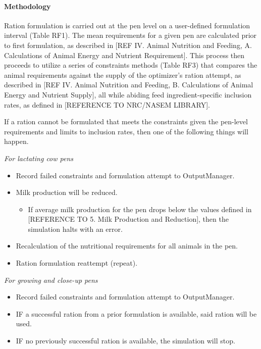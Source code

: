 \begin{refsection}
\paragraph{Methodology}

 Ration formulation is carried out at the pen level on a user-defined formulation interval (Table RF1). The mean requirements for a given pen are calculated prior to first formulation, as described in [REF IV. Animal Nutrition and Feeding, A. Calculations of Animal Energy and Nutrient Requirement]. This process then proceeds to utilize a series of constraints methods (Table RF3) that compares the animal requirements against the supply of the optimizer’s ration attempt, as described in [REF IV. Animal Nutrition and Feeding, B. Calculations of Animal Energy and Nutrient Supply], all while abiding feed ingredient-specific inclusion rates, as defined in [REFERENCE TO NRC/NASEM LIBRARY]. 

If a ration cannot be formulated that meets the constraints given the pen-level requirements and limits to inclusion rates, then one of the following things will happen.
\vspace{0.2cm}

\textit{For lactating cow pens}
\begin{itemize}
    \item Record failed constraints and formulation attempt to OutputManager.
    \item Milk production will be reduced.
    \begin{itemize}
        \item If average milk production for the pen drops below the values defined in [REFERENCE TO 5. Milk Production and Reduction], then the simulation halts with an error.
    \end{itemize}
    \item Recalculation of the nutritional requirements for all animals in the pen.
    \item Ration formulation reattempt (repeat).
\end{itemize}

\textit{For growing and close-up pens}
\begin{itemize}
    \item Record failed constraints and formulation attempt to OutputManager.
    \item IF a successful ration from a prior formulation is available, said ration will be used.
    \item IF no previously successful ration is available, the simulation will stop.


\end{itemize}
\end{refsection}
